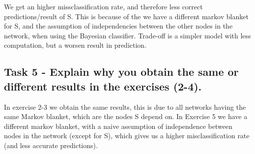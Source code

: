 \documentclass[]{article}
\begin{document}
We get an higher missclassification rate, and therefore less correct
predictions/result of S. This is because of the we have a different
markov blanket for S, and the assumption of independencies between the
other nodes in the network, when using the Bayesian classifier.
Trade-off is a simpler model with less computation, but a worsen result
in prediction.

\hypertarget{task-5---explain-why-you-obtain-the-same-or-different-results-in-the-exercises-2-4.}{%
\subsection{Task 5 - Explain why you obtain the same or different
results in the exercises
(2-4).}\label{task-5---explain-why-you-obtain-the-same-or-different-results-in-the-exercises-2-4.}}

In exercise 2-3 we obtain the same results, this is due to all networks
having the same Markov blanket, which are the nodes S depend on. In
Exercise 5 we have a different markov blanket, with a naive assumption
of independence between nodes in the network (except for S), which gives
us a higher misclassification rate (and less accurate predictions).
\end{document}
